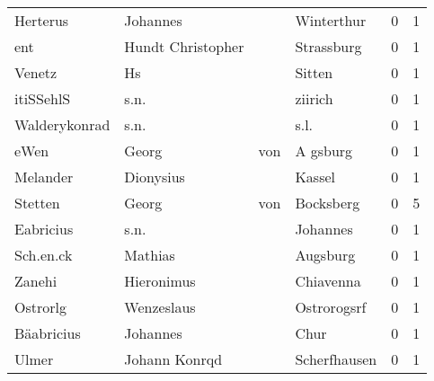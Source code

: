 \begin{tabular}{llllrr}
                 Herterus &                           Johannes &             &                                  Winterthur &          0 &         1 \\
                      ent &                  Hundt Christopher &             &                                  Strassburg &          0 &         1 \\
                   Venetz &                                 Hs &             &                                      Sitten &          0 &         1 \\
                itiSSehlS &                               s.n. &             &                                     ziirich &          0 &         1 \\
            Walderykonrad &                               s.n. &             &                                        s.l. &          0 &         1 \\
                     eWen &                              Georg &         von &                                    A gsburg &          0 &         1 \\
                 Melander &                          Dionysius &             &                                      Kassel &          0 &         1 \\
                  Stetten &                              Georg &         von &                                   Bocksberg &          0 &         5 \\
                Eabricius &                               s.n. &             &                                    Johannes &          0 &         1 \\
                Sch.en.ck &                            Mathias &             &                                    Augsburg &          0 &         1 \\
                   Zanehi &                         Hieronimus &             &                                   Chiavenna &          0 &         1 \\
                 Ostrorlg &                         Wenzeslaus &             &                                 Ostrorogsrf &          0 &         1 \\
               Bäabricius &                           Johannes &             &                                        Chur &          0 &         1 \\
                    Ulmer &                      Johann Konrqd &             &                                Scherfhausen &          0 &         1 \\

\end{tabular}

